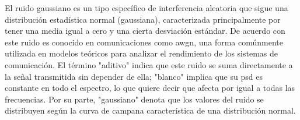 \begin{justify}
    El ruido gaussiano es un tipo específico de interferencia aleatoria que sigue una distribución estadística normal (gaussiana),
    caracterizada principalmente por tener una media igual a cero y una cierta desviación estándar. De acuerdo con \textcite{carlson2010communication} este ruido es conocido en comunicaciones como \gls{awgn}, una forma
    comúnmente utilizada en modelos teóricos para analizar el rendimiento de los sistemas de comunicación.
    El término "aditivo" indica que este ruido se suma directamente a la señal transmitida sin depender de ella; "blanco" implica que su \gls{psd} es constante
    en todo el espectro, lo que quiere decir que afecta por igual a todas las frecuencias. Por su parte, "gaussiano" denota que los valores del ruido se distribuyen
    según la curva de campana característica de una distribución normal.
\end{justify}



        
        
